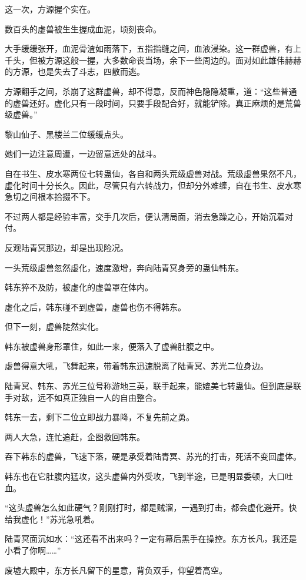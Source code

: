 \begin{this_body}
这一次，方源握个实在。

数百头的虚兽被生生握成血泥，顷刻丧命。

大手缓缓张开，血泥骨渣如雨落下，五指指缝之间，血液浸染。这一群虚兽，有上千头，但被方源这般一握，大多数命丧当场，余下一些周边的。面对如此雄伟赫赫的方源，也是失去了斗志，四散而逃。

方源翻手之间，杀崩了这群虚兽，却不得意，反而神色隐隐凝重，道：“这些普通的虚兽还好。虚化只有一段时间，只要手段配合好，就能铲除。真正麻烦的是荒兽级虚兽。”

黎山仙子、黑楼兰二位缓缓点头。

她们一边注意周遭，一边留意远处的战斗。

自在书生、皮水寒两位七转蛊仙，各自和两头荒级虚兽对战。荒级虚兽果然不凡，虚化时间十分长久。因此，尽管只有六转战力，但却分外难缠，自在书生、皮水寒急切之间根本拾掇不下。

不过两人都是经验丰富，交手几次后，便认清局面，消去急躁之心，开始沉着对付。

反观陆青冥那边，却是出现险况。

一头荒级虚兽忽然虚化，速度激增，奔向陆青冥身旁的蛊仙韩东。

韩东猝不及防，被虚化的虚兽罩在体内。

虚化之后，韩东碰不到虚兽，虚兽也伤不得韩东。

但下一刻，虚兽陡然实化。

韩东被虚兽身形罩住，如此一来，便落入了虚兽肚腹之中。

虚兽得意大吼，飞舞起来，带着韩东迅速脱离了陆青冥、苏光二位身边。

陆青冥、韩东、苏光三位号称游地三英，联手起来，能媲美七转蛊仙。但到底是联手对敌，远不如真正独自一人的自由整合。

韩东一去，剩下二位立即战力暴降，不复先前之勇。

两人大急，连忙追赶，企图救回韩东。

吞下韩东的虚兽，飞速下落，硬是承受着陆青冥、苏光的打击，死活不变回虚体。

韩东也在它肚腹内猛攻，这头虚兽内外受攻，飞到半途，已是明显委顿，大口吐血。

“这头虚兽怎么如此硬气？刚刚打时，都是贼溜，一遇到打击，都会虚化避开。快给我虚化！”苏光急吼着。

陆青冥面沉如水：“这还看不出来吗？一定有幕后黑手在操控。东方长凡，我还是小看了你啊……”

废墟大殿中，东方长凡留下的星意，背负双手，仰望着高空。


\end{this_body}
